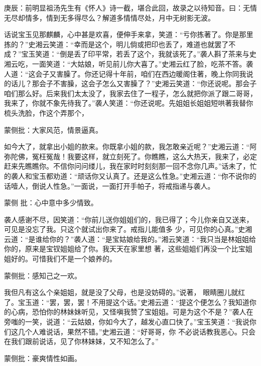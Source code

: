 \begin{parag}

    \begin{note}庚辰：前明显祖汤先生有《怀人》诗一截，堪合此回，故录之以待知音。曰：无情无尽却情多，情到无多得尽么？解道多情情尽处，月中无树影无波。\end{note}
\end{parag}

\begin{parag}

    话说宝玉见那麒麟，心中甚是欢喜，便伸手来拿，笑道：“亏你拣著了。你是那里拣的？”史湘云笑道：“幸而是这个，明儿倘或把印也丢了，难道也就罢了不 成？”宝玉笑道：“倒是丢了印平常，若丢了这个，我就该死了。”袭人斟了茶来与史湘云吃，一面笑道：“大姑娘，听见前儿你大喜了。”史湘云红了脸，吃茶不答。袭人道：“这会子又害臊了。你还记得十年前，咱们在西边暖阁住著，晚上你同我说的话儿？那会子不害臊，这会子怎么又害臊了？”史湘云笑道：“你还说呢。那会子咱们那么好。后来我们太太没了，我家去住了一程子，怎么就把你派了跟二哥哥，我来了，你就不象先待我了。”袭人笑道：“你还说呢。先姐姐长姐姐短哄著我替你梳头洗脸，作这个弄那个，\begin{note}蒙侧批：大家风范，情景逼真。\end{note}如今大了，就拿出小姐的款来。你既拿小姐的款，我怎敢亲近呢？”史湘云道：“阿弥陀佛，冤枉冤哉！我要这样，就立刻死了。你瞧瞧，这么大热天，我来了，必定赶来先瞧瞧你。不信你问问缕儿，我在家时时刻刻那一回不念你几声。”话未了，忙的袭人和宝玉都劝道：“顽话你又认真了。还是这么性急。”史湘云道：“你不说你的话噎人，倒说人性急。”一面说，一面打开手帕子，将戒指递与袭人。\begin{note}蒙侧 批：心中意中多少情致。\end{note}袭人感谢不尽，因笑道：“你前儿送你姐姐们的，我已得了；今儿你亲自又送来，可见是没忘了我。只这个就试出你来了。戒指儿能值多 少，可见你的心真。”史湘云道：“是谁给你的？”袭人道：“是宝姑娘给我的。”湘云笑道：“我只当是林姐姐给你的，原来是宝钗姐姐给了你。我天天在家里想 著，这些姐姐们再没一个比宝姐姐好的。可惜我们不是一个娘养的。\begin{note}蒙侧批：感知己之一欢。\end{note}我但凡有这么个亲姐姐，就是没了父母，也是没妨碍的。”说著， 眼睛圈儿就红了。宝玉道：“罢，罢，罢！不用提这个话。”史湘云道：“提这个便怎么？我知道你的心病，恐怕你的林妹妹听见，又怪嗔我赞了宝姐姐。可是为这个不是？”袭人在旁嗤的一笑，说道：“云姑娘，你如今大了，越发心直口快了。”宝玉笑道：“我说你们这几个人难说话，果然不错。”史湘云道：“好哥哥，你 不必说话教我恶心。只会在我们跟前说话，见了你林妹妹，又不知怎么了。”\begin{note}蒙侧批：豪爽情性如画。\end{note}
\end{parag}


